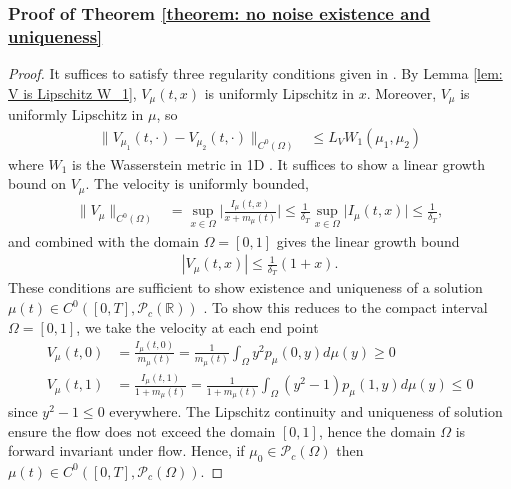 \documentclass[10pt]{article}
\begin{document}
\subsubsection*{Proof of Theorem \ref{theorem: no noise existence and uniqueness}}
\begin{proof}
It suffices to satisfy three regularity conditions given in \cite[Theorem 2]{Bonnet2017ThePM}.
By Lemma \ref{lem: V is Lipschitz W_1}, $V_\mu(t,x)$ is uniformly Lipschitz in $x$.
Moreover, $V_\mu$ is uniformly Lipschitz in $\mu$, so
\begin{align*}
    \|V_{\mu_1}(t,\cdot) - V_{\mu_2}(t,\cdot)\|_{C^0(\Omega)} &\leq L_V W_1(\mu_1,\mu_2)
\end{align*}
where $W_1$ is the Wasserstein metric in 1D \cite{Villani2009}. It suffices to show a linear growth bound on $V_\mu$. The velocity is uniformly bounded, 
    \begin{align*}
        \|V_\mu\|_{C^0(\Omega)} &= \sup_{x \in \Omega}\bigg|\frac{I_\mu(t,x)}{x+m_\mu(t)}\bigg| \leq \frac{1}{\delta_T}\sup_{x \in \Omega}\big|I_\mu(t,x)\big| \leq \frac{1}{\delta_T},
    \end{align*}
and combined with the domain $\Omega = [0,1]$ gives the linear growth bound 
\begin{align*}
    |V_\mu(t,x)| \leq \frac{1}{\delta_T}(1+x).
\end{align*}
These conditions are sufficient to show existence and uniqueness of a solution $\mu(t) \in C^0([0,T], \mathcal{P}_c(\mathbb{R}))$ \cite{Bonnet2017ThePM}.
To show this reduces to the compact interval $\Omega=[0,1]$, we take the velocity at each end point
\begin{align*}
    V_\mu(t,0)  &= \frac{I_\mu(t,0)}{m_\mu(t)} = \frac{1}{m_\mu(t)}\int_\Omega y^2p_\mu(0,y) d \mu(y) \geq 0\\
    V_\mu(t,1)  &= \frac{I_\mu(t,1)}{1+m_\mu(t)} = \frac{1}{1+m_\mu(t)}\int_\Omega (y^2-1)p_\mu(1,y) d\mu(y) \leq 0
\end{align*}
since $y^2-1\leq 0$ everywhere. The Lipschitz continuity and uniqueness of solution ensure the flow does not exceed the domain $[0,1]$, hence the domain $\Omega$ is forward invariant under flow. Hence, if $\mu_0 \in \mathcal{P}_c(\Omega)$ then $\mu(t) \in C^0([0,T], \mathcal{P}_c(\Omega))$.
\end{proof}
\end{document}
